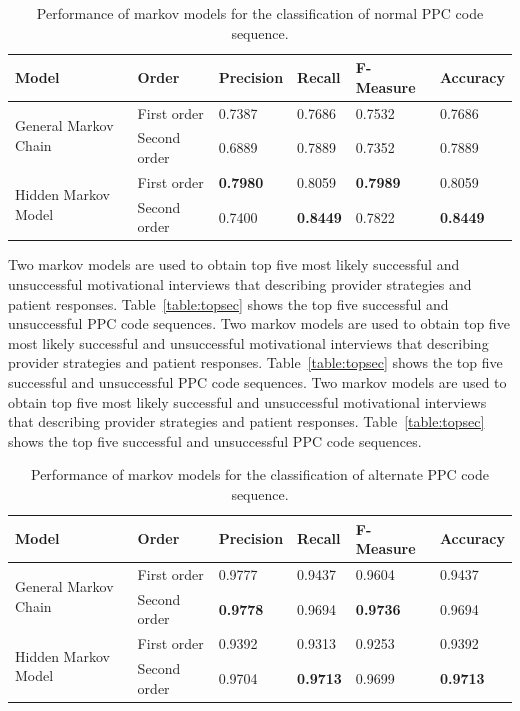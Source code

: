 \documentclass{amia}
\begin{document}
\begin{table}[h]
\centering
\caption{Performance of markov models for the classification of normal PPC code sequence.}
\label{tab:result_norm_seq}
  \begin{tabular}{|l|l|l|l|l|l|}
  \hline
   \textbf{Model} & \textbf{Order}  & \textbf{Precision}  & \textbf{Recall} & \textbf{F-Measure} & \textbf{Accuracy}\\ \hline    
    
 \multirow{2}{*}{General Markov Chain} & First order & 0.7387 & 0.7686 & 0.7532 & 0.7686\\\cline{2-6}
 & Second order & 0.6889 & 0.7889 & 0.7352 & 0.7889\\ \hline
 \multirow{2}{*}{Hidden Markov Model} & First order & \textbf{0.7980} & 0.8059 & \textbf{0.7989} & 0.8059\\ \cline{2-6}
 & Second order & 0.7400 & \textbf{0.8449} & 0.7822  & \textbf{0.8449}\\ \hline
 
  \end{tabular}
\end{table}

Two markov models are used to obtain top five most likely successful and unsuccessful motivational interviews that describing provider strategies and patient responses. Table~\ref{table:topsec} shows the top five successful and unsuccessful PPC code sequences. Two markov models are used to obtain top five most likely successful and unsuccessful motivational interviews that describing provider strategies and patient responses. Table~\ref{table:topsec} shows the top five successful and unsuccessful PPC code sequences. Two markov models are used to obtain top five most likely successful and unsuccessful motivational interviews that describing provider strategies and patient responses. Table~\ref{table:topsec} shows the top five successful and unsuccessful PPC code sequences. \\

\begin{table}[h]
\centering
\caption{Performance of markov models for the classification of alternate PPC code sequence.}
\label{tab:result_alt_seq}
  \begin{tabular}{|l|l|l|l|l|l|}
  \hline
   \textbf{Model} & \textbf{Order}  & \textbf{Precision}  & \textbf{Recall} & \textbf{F-Measure} & \textbf{Accuracy}\\ \hline    
    
 \multirow{2}{*}{General Markov Chain} & First order & 0.9777 & 0.9437 & 0.9604 & 0.9437\\\cline{2-6}
 & Second order & \textbf{0.9778} & 0.9694 & \textbf{0.9736} & 0.9694\\ \hline
 \multirow{2}{*}{Hidden Markov Model} & First order & 0.9392 & 0.9313 & 0.9253 & 0.9392\\ \cline{2-6}
 & Second order & 0.9704 & \textbf{0.9713} & 0.9699  & \textbf{0.9713}\\ \hline
 
  \end{tabular}
\end{table}
\end{document}

